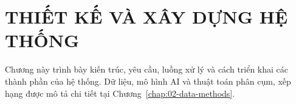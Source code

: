 \chapter{THIẾT KẾ VÀ XÂY DỰNG HỆ THỐNG}\label{chap:03-system}
Chương này trình bày kiến trúc, yêu cầu, luồng xử lý và cách triển khai các thành phần của hệ thống. Dữ liệu, mô hình AI và thuật toán phân cụm, xếp hạng được mô tả chi tiết tại Chương~\ref{chap:02-data-methods}.








